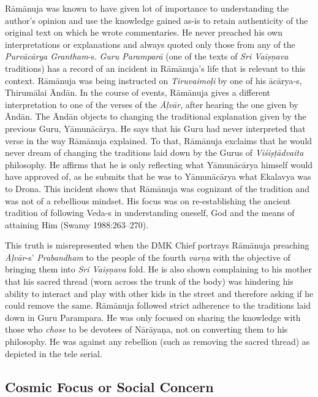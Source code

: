 Rāmānuja was known to have given lot of importance to understanding the author’s opinion and use the knowledge gained as-is to retain authenticity of the original text on which he wrote commentaries. He never preached his own interpretations or explanations and always quoted only those from any of the \textit{Purvācārya Grantham}-s. \textit{Guru Paramparā} (one of the texts of \textit{Sri Vaiṣņava} traditions) has a record of an incident in Rāmānuja’s life that is relevant to this context. Rāmānuja was being instructed on \textit{Tiruvaimoḷi }by one of his ācārya-s, Thirumālai Āndān. In the course of events, Rāmānuja gives a different interpretation to one of the verses of the \textit{Āḷvār}, after hearing the one given by Āndān. The Āndān objects to changing the traditional explanation given by the previous Guru, Yāmunācārya. He says that his Guru had never interpreted that verse in the way Rāmānuja explained. To that, Rāmānuja exclaims that he would never dream of changing the traditions laid down by the Gurus of \textit{Viśiṣṭādvaita} philosophy. He affirms that he is only reflecting what Yāmunācārya himself would have approved of, as he submits that he was to Yāmunācārya what Ekalavya was to Drona. This incident shows that Rāmānuja was cognizant of the tradition and was not of a rebellious mindset. His focus was on re-establishing the ancient tradition of following Veda-s in understanding oneself, God and the means of attaining Him (Swamy 1988:263–270).

This truth is misrepresented when the DMK Chief portrays Rāmānuja preaching \textit{Āḷvār}-s’ \textit{Prabandham} to the people of the fourth\textit{ varņa} with the objective of bringing them into \textit{Sri Vaiṣņava} fold. He is also shown complaining to his mother that his sacred thread (worn across the trunk of the body) was hindering his ability to interact and play with other kids in the street and therefore asking if he could remove the same. Rāmānuja followed strict adherence to the traditions laid down in Guru Parampara. He was only focused on sharing the knowledge with those who \textit{chose} to be devotees of Nārāyaṇa, not on converting them to his philosophy. He was against any rebellion (such as removing the sacred thread) as depicted in the tele serial.


\subsection*{Cosmic Focus or Social Concern}


